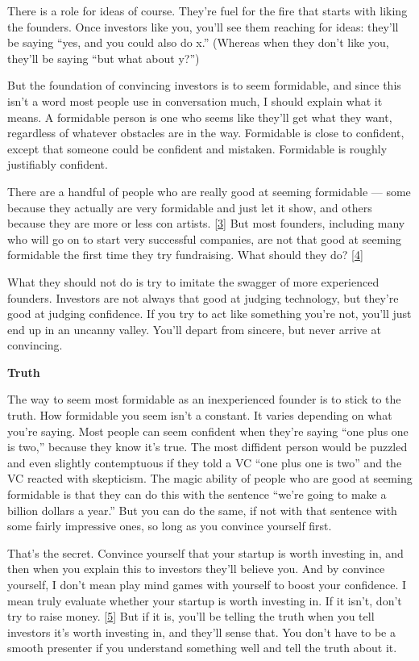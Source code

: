 There is a role for ideas of course. They're fuel for the fire that
starts with liking the founders. Once investors like you, you'll see
them reaching for ideas: they'll be saying ``yes, and you could also do
x.'' (Whereas when they don't like you, they'll be saying ``but what
about y?'')

But the foundation of convincing investors is to seem formidable, and
since this isn't a word most people use in conversation much, I should
explain what it means. A formidable person is one who seems like they'll
get what they want, regardless of whatever obstacles are in the way.
Formidable is close to confident, except that someone could be confident
and mistaken. Formidable is roughly justifiably confident.

There are a handful of people who are really good at seeming formidable
--- some because they actually are very formidable and just let it show,
and others because they are more or less con artists.
{[}\hyperref[f3n]{3}{]} But most founders, including many who will go on
to start very successful companies, are not that good at seeming
formidable the first time they try fundraising. What should they do?
{[}\hyperref[f4n]{4}{]}

What they should not do is try to imitate the swagger of more
experienced founders. Investors are not always that good at judging
technology, but they're good at judging confidence. If you try to act
like something you're not, you'll just end up in an uncanny valley.
You'll depart from sincere, but never arrive at convincing.

\textbf{Truth}

The way to seem most formidable as an inexperienced founder is to stick
to the truth. How formidable you seem isn't a constant. It varies
depending on what you're saying. Most people can seem confident when
they're saying ``one plus one is two,'' because they know it's true. The
most diffident person would be puzzled and even slightly contemptuous if
they told a VC ``one plus one is two'' and the VC reacted with
skepticism. The magic ability of people who are good at seeming
formidable is that they can do this with the sentence ``we're going to
make a billion dollars a year.'' But you can do the same, if not with
that sentence with some fairly impressive ones, so long as you convince
yourself first.

That's the secret. Convince yourself that your startup is worth
investing in, and then when you explain this to investors they'll
believe you. And by convince yourself, I don't mean play mind games with
yourself to boost your confidence. I mean truly evaluate whether your
startup is worth investing in. If it isn't, don't try to raise money.
{[}\hyperref[f5n]{5}{]} But if it is, you'll be telling the truth when
you tell investors it's worth investing in, and they'll sense that. You
don't have to be a smooth presenter if you understand something well and
tell the truth about it.

